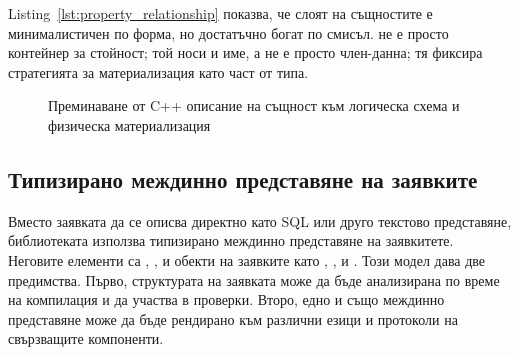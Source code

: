 Listing~\ref{lst:property_relationship} показва, че слоят на същностите е минималистичен по форма, но достатъчно богат по смисъл.  не е просто контейнер за стойност; той носи и име, а  не е просто член-данна; тя фиксира стратегията за материализация като част от типа.

\begin{figure}[H]
\centering
{}
\caption{Преминаване от C++ описание на същност към логическа схема и физическа материализация}
\label{fig:entity_to_schema_mapping}
\end{figure}

\subsection{Типизирано междинно представяне на заявките}

Вместо заявката да се описва директно като SQL или друго текстово представяне, библиотеката използва типизирано междинно представяне на заявкитете. Неговите елементи са , ,  и обекти на заявките като , ,  и . Този модел дава две предимства. Първо, структурата на заявката може да бъде анализирана по време на компилация и да участва в  проверки. Второ, едно и също междинно представяне може да бъде рендирано към различни езици и протоколи на свързващите компоненти.

